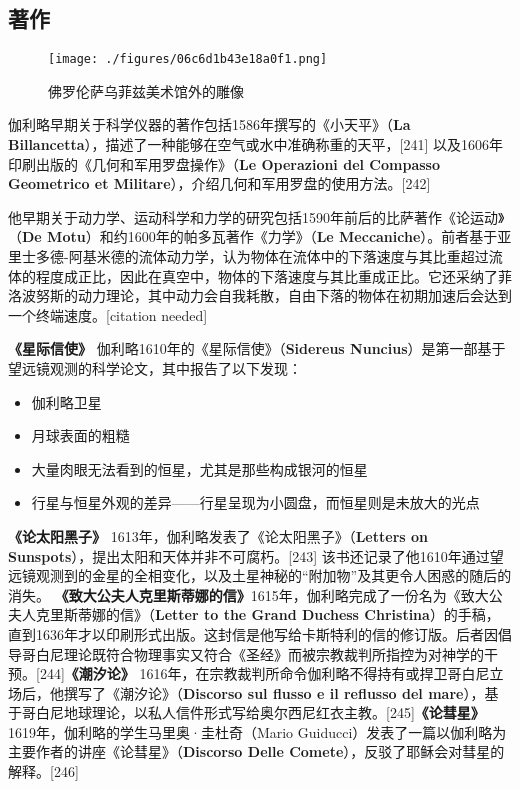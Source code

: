 \subsection{著作}  
\begin{figure}[ht]
\centering
\texttt{[image: ./figures/06c6d1b43e18a0f1.png]}
\caption{佛罗伦萨乌菲兹美术馆外的雕像} \label{fig_JLL_19}
\end{figure} 
伽利略早期关于科学仪器的著作包括1586年撰写的《小天平》（\textbf{La Billancetta}），描述了一种能够在空气或水中准确称重的天平，[241] 以及1606年印刷出版的《几何和军用罗盘操作》（\textbf{Le Operazioni del Compasso Geometrico et Militare}），介绍几何和军用罗盘的使用方法。[242]  

他早期关于动力学、运动科学和力学的研究包括1590年前后的比萨著作《论运动》（\textbf{De Motu}）和约1600年的帕多瓦著作《力学》（\textbf{Le Meccaniche}）。前者基于亚里士多德-阿基米德的流体动力学，认为物体在流体中的下落速度与其比重超过流体的程度成正比，因此在真空中，物体的下落速度与其比重成正比。它还采纳了菲洛波努斯的动力理论，其中动力会自我耗散，自由下落的物体在初期加速后会达到一个终端速度。[citation needed]  

\textbf{《星际信使》}  
伽利略1610年的《星际信使》（\textbf{Sidereus Nuncius}）是第一部基于望远镜观测的科学论文，其中报告了以下发现：  

\begin{itemize}
\item 伽利略卫星  
\item 月球表面的粗糙  
\item 大量肉眼无法看到的恒星，尤其是那些构成银河的恒星  
\item 行星与恒星外观的差异——行星呈现为小圆盘，而恒星则是未放大的光点
\end{itemize}  

\textbf{《论太阳黑子》}  1613年，伽利略发表了《论太阳黑子》（\textbf{Letters on Sunspots}），提出太阳和天体并非不可腐朽。[243] 该书还记录了他1610年通过望远镜观测到的金星的全相变化，以及土星神秘的“附加物”及其更令人困惑的随后的消失。  \textbf{《致大公夫人克里斯蒂娜的信》}1615年，伽利略完成了一份名为《致大公夫人克里斯蒂娜的信》（\textbf{Letter to the Grand Duchess Christina}）的手稿，直到1636年才以印刷形式出版。这封信是他写给卡斯特利的信的修订版。后者因倡导哥白尼理论既符合物理事实又符合《圣经》而被宗教裁判所指控为对神学的干预。[244]\textbf{《潮汐论》}  1616年，在宗教裁判所命令伽利略不得持有或捍卫哥白尼立场后，他撰写了《潮汐论》（\textbf{Discorso sul flusso e il reflusso del mare}），基于哥白尼地球理论，以私人信件形式写给奥尔西尼红衣主教。[245]\textbf{《论彗星》}1619年，伽利略的学生马里奥·圭杜奇（Mario Guiducci）发表了一篇以伽利略为主要作者的讲座《论彗星》（\textbf{Discorso Delle Comete}），反驳了耶稣会对彗星的解释。[246]  

